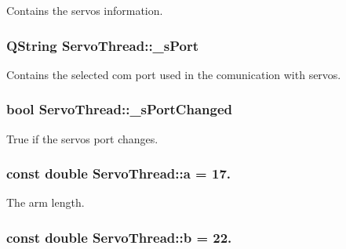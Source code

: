 Contains the servos information. 

\hypertarget{class_servo_thread_ac9a614aa1518efb49b0a06636bd1bdbf}{}
\subsubsection[{\+\_\+s\+Port}]{\setlength{\rightskip}{0pt plus 5cm}Q\+String Servo\+Thread\+::\+\_\+s\+Port\hspace{0.3cm}{\ttfamily [private]}}\label{class_servo_thread_ac9a614aa1518efb49b0a06636bd1bdbf}


Contains the selected com port used in the comunication with servos. 

\hypertarget{class_servo_thread_a6e803432db01b10ed975132315280fd3}{}
\subsubsection[{\+\_\+s\+Port\+Changed}]{\setlength{\rightskip}{0pt plus 5cm}bool Servo\+Thread\+::\+\_\+s\+Port\+Changed\hspace{0.3cm}{\ttfamily [private]}}\label{class_servo_thread_a6e803432db01b10ed975132315280fd3}


True if the servos port changes. 

\hypertarget{class_servo_thread_a7dc3998d380d61406fe4485f9872edff}{}
\subsubsection[{a}]{\setlength{\rightskip}{0pt plus 5cm}const double Servo\+Thread\+::a = 17.\hspace{0.3cm}{\ttfamily [private]}}\label{class_servo_thread_a7dc3998d380d61406fe4485f9872edff}


The arm length. 

\hypertarget{class_servo_thread_a14f03febaa39a60b9bf7ff9b9151060c}{}
\subsubsection[{b}]{\setlength{\rightskip}{0pt plus 5cm}const double Servo\+Thread\+::b = 22.\hspace{0.3cm}{\ttfamily [private]}}\label{class_servo_thread_a14f03febaa39a60b9bf7ff9b9151060c}


